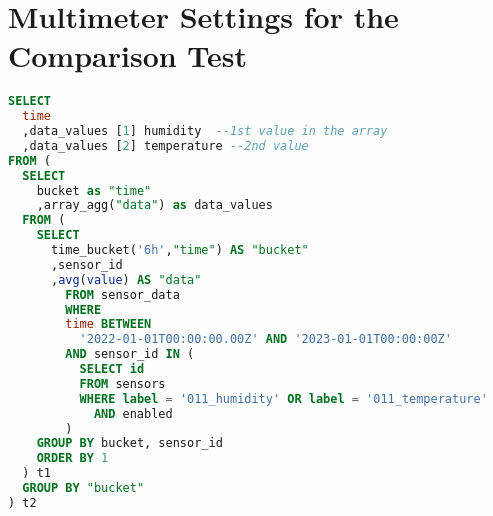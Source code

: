 \documentclass[12pt]{book}
\begin{document}
\section{Multimeter Settings for the Comparison Test}
\begin{lstlisting}[language=sql,title=SQL query]
SELECT
  time
  ,data_values [1] humidity  --1st value in the array
  ,data_values [2] temperature --2nd value
FROM (
  SELECT
    bucket as "time"
    ,array_agg("data") as data_values
  FROM (
    SELECT
      time_bucket('6h',"time") AS "bucket"
      ,sensor_id
      ,avg(value) AS "data"
        FROM sensor_data
        WHERE
        time BETWEEN
          '2022-01-01T00:00:00.00Z' AND '2023-01-01T00:00:00Z'
        AND sensor_id IN (
          SELECT id
          FROM sensors
          WHERE label = '011_humidity' OR label = '011_temperature'
            AND enabled
        )
    GROUP BY bucket, sensor_id
    ORDER BY 1
  ) t1
  GROUP BY "bucket"
) t2
\end{lstlisting}
\end{document}
